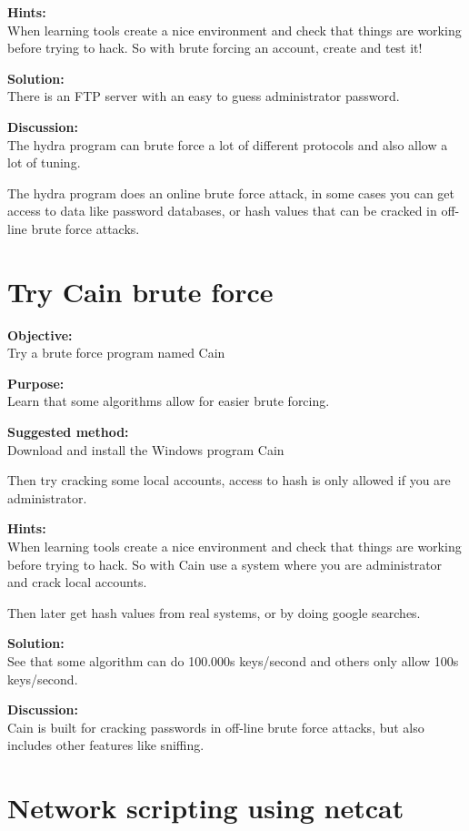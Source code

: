 \documentclass[a4paper,11pt,notitlepage]{report}
\begin{document}
{\bf Hints:} \\
When learning tools create a nice environment and check that things are working
before trying to hack. So with brute forcing an account, create and test it!

{\bf Solution:}\\
There is an FTP server with an easy to guess administrator password.

{\bf Discussion:}\\
The hydra program can brute force a lot of different protocols and also
allow a lot of tuning.

The hydra program does an online brute force attack, in some cases you
can get access to data like password databases, or hash values that can
be cracked in off-line brute force attacks.

\chapter{Try Cain brute force}
\label{ex:cain-brute}



{\bf Objective:}\\
Try a brute force program named Cain

{\bf Purpose:}\\
Learn that some algorithms allow for easier brute forcing.

{\bf Suggested method:} \\
Download and install the Windows program Cain

Then try cracking some local accounts, access to hash is only allowed if you are administrator.

{\bf Hints:} \\
When learning tools create a nice environment and check that things are working
before trying to hack. So with Cain use a system where you are administrator and crack local accounts.

Then later get hash values from real systems, or by doing google searches.

{\bf Solution:}\\
See that some algorithm can do 100.000s keys/second and others only allow 100s keys/second.

{\bf Discussion:}\\
Cain is built for cracking passwords in off-line brute force attacks, but also includes other features like sniffing.


\chapter{Network scripting using netcat}
\label{ex:netcat-1}
\end{document}
